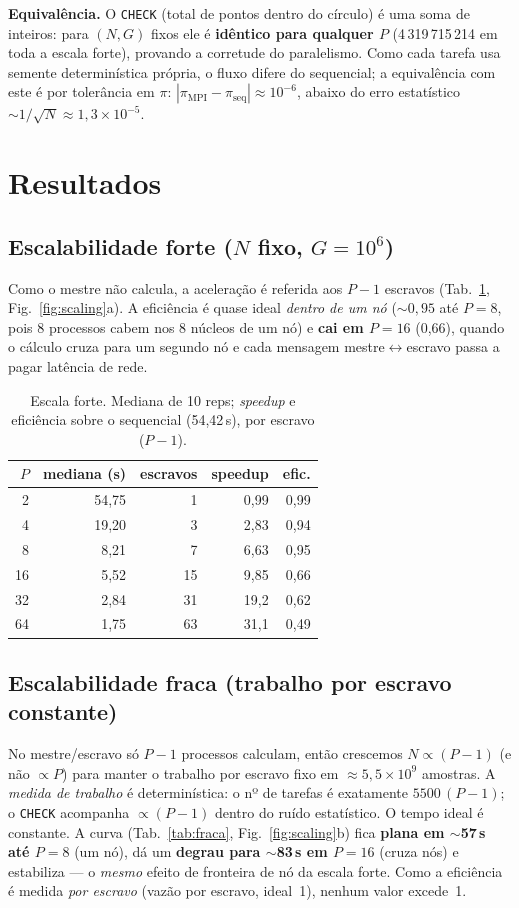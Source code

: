 \documentclass[10pt,twocolumn,a4paper]{article}
\begin{document}
\textbf{Equivalência.} O \texttt{CHECK} (total de pontos dentro do círculo) é uma
soma de inteiros: para $(N,G)$ fixos ele é \textbf{idêntico para qualquer $P$}
(4\,319\,715\,214 em toda a escala forte), provando a corretude do paralelismo.
Como cada tarefa usa semente determinística própria, o fluxo difere do sequencial;
a equivalência com este é por tolerância em $\pi$: $|\pi_\text{MPI}-\pi_\text{seq}|
\approx 10^{-6}$, abaixo do erro estatístico $\sim 1/\sqrt{N}\approx 1{,}3\times10^{-5}$.

\section{Resultados}

\subsection{Escalabilidade forte ($N$ fixo, $G=10^6$)}
Como o mestre não calcula, a aceleração é referida aos $P{-}1$ escravos
(Tab.~\ref{tab:forte}, Fig.~\ref{fig:scaling}a). A eficiência é quase ideal
\emph{dentro de um nó} ($\sim0{,}95$ até $P=8$, pois 8 processos cabem nos 8 núcleos
de um nó) e \textbf{cai em $P=16$} (0,66), quando o cálculo cruza para um segundo nó
e cada mensagem mestre$\leftrightarrow$escravo passa a pagar latência de rede.

\begin{table}[t]\centering\footnotesize
\caption{Escala forte. Mediana de 10 reps; \emph{speedup} e eficiência sobre o
sequencial (54,42\,s), por escravo ($P{-}1$).}\label{tab:forte}
\begin{tabular}{rrrrr}
\toprule
$P$ & mediana (s) & escravos & speedup & efic. \\
\midrule
2  & 54,75 & 1  & 0,99 & 0,99 \\
4  & 19,20 & 3  & 2,83 & 0,94 \\
8  &  8,21 & 7  & 6,63 & 0,95 \\
16 &  5,52 & 15 & 9,85 & 0,66 \\
32 &  2,84 & 31 & 19,2 & 0,62 \\
64 &  1,75 & 63 & 31,1 & 0,49 \\
\bottomrule
\end{tabular}
\end{table}

\subsection{Escalabilidade fraca (trabalho por escravo constante)}
No mestre/escravo só $P{-}1$ processos calculam, então crescemos $N\propto(P{-}1)$
(e não $\propto P$) para manter o trabalho por escravo fixo em $\approx 5{,}5\times10^{9}$
amostras. A \emph{medida de trabalho} é determinística: o nº de tarefas é
exatamente $5500\,(P{-}1)$; o \texttt{CHECK} acompanha $\propto(P{-}1)$ dentro do
ruído estatístico. O tempo ideal é constante. A curva (Tab.~\ref{tab:fraca},
Fig.~\ref{fig:scaling}b) fica \textbf{plana em $\sim$57\,s até $P=8$}
(um nó), dá um \textbf{degrau para $\sim$83\,s em $P=16$} (cruza nós) e
estabiliza --- o \emph{mesmo} efeito de fronteira de nó da escala forte. Como a
eficiência é medida \emph{por escravo} (vazão por escravo, ideal~1), nenhum valor
excede~1.
\end{document}
